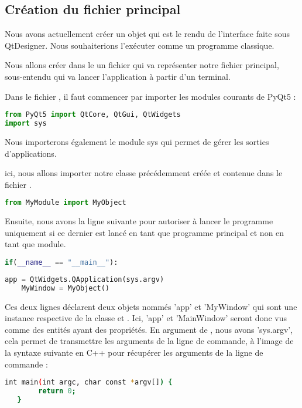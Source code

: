 \documentclass[12pt]{report}    %
\begin{document}
\subsection{Création du fichier principal}

Nous avons actuellement créer un objet  qui est le rendu de l'interface faite sous QtDesigner. Nous souhaiterions l'exécuter comme un programme classique. \newline


Nous allons créer dans le  un fichier  qui va représenter notre fichier principal, sous-entendu qui va lancer l'application à partir d'un terminal. \newline


Dans le fichier , il faut commencer par importer les modules courants de PyQt5 : 
\begin{lstlisting}[language=Python]
from PyQt5 import QtCore, QtGui, QtWidgets
import sys
\end{lstlisting}
Nous importerons également le module sys qui permet de gérer les sorties d'applications. \newline

ici, nous allons importer notre classe  précédemment créée et contenue dans le fichier .
\begin{lstlisting}[language=Python]
from MyModule import MyObject
\end{lstlisting}


Ensuite, nous avons la ligne suivante pour autoriser à lancer le programme uniquement si ce dernier est lancé en tant que programme principal et non en tant que module.

\begin{lstlisting}[language=Python]
if(__name__ == "__main__"):
\end{lstlisting}


\begin{lstlisting}[language=Python]
    app = QtWidgets.QApplication(sys.argv)
    MyWindow = MyObject()
\end{lstlisting}

Ces deux lignes déclarent deux objets nommés 'app' et 'MyWindow' qui sont une instance respective de la classe  et . \newline
Ici, 'app' et 'MainWindow' seront donc vus comme des entités ayant des propriétés.\newline
En argument de , nous avons 'sys.argv', cela permet de transmettre les arguments de la ligne de commande, à l'image de la syntaxe suivante en C++ pour récupérer les arguments de la ligne de commande : \newline\newline
\begin{lstlisting}[language=bash]
   int main(int argc, char const *argv[]) {
        return 0;
   }
\end{lstlisting}
\end{document}
